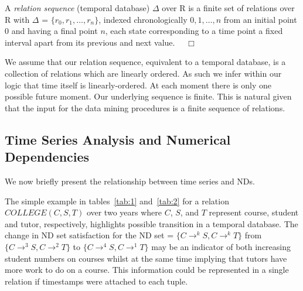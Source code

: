 \begin{definition}
\begin{rm}
A {\em relation sequence} (temporal database) $\Delta$ over R is a
finite set of 
relations over R with $\Delta$ = $\{ r_0, r_1, \ldots, r_n \}$,
indexed chronologically $0, 1, \ldots, n$ from an initial point 0 and
having a final point $n$, each state corresponding to a time point a
fixed interval apart from its previous and next value. $\quad\Box$
\end{rm}
\end{definition}

We assume that our relation sequence, equivalent to a temporal
database, is a collection of
relations which are linearly ordered. As such we infer within our
logic that time itself is linearly-ordered. At each moment there is
only one possible future moment. 
Our underlying sequence is finite. This is natural given that the
input for the
data mining procedures is a finite sequence of relations.


\subsection{Time Series Analysis and Numerical
Dependencies}\label{subsec:tl_tsa_nd}

We now briefly present the relationship between time series and NDs.

\smallskip

The simple example in tables~\ref{tab:1} and~\ref{tab:2} for
a relation $COLLEGE(C,S,T)$ over two years where $C$, $S$, and $T$
represent course, student and tutor, respectively, highlights possible
transition in a temporal database. The change in ND set satisfaction
for the ND set = $\{ C \to^k S, C \to^k T \}$ from $\{ C \to^3 S, C \to^2 T \}$
to $\{ C \to^4 S, C \to^1 T \}$ may be an indicator of both increasing
student numbers on courses whilst at the same time implying that
tutors have more work to do on a course. This information could be
represented in a single relation if timestamps were attached to each
tuple.


